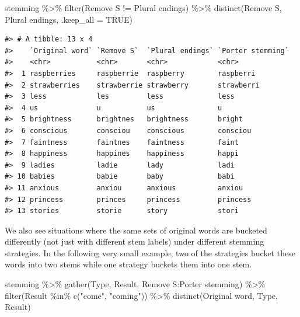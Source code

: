 \documentclass[
]{krantz}
\makeatletter
\newenvironment{Shaded}{\begin{snugshade}}{\end{snugshade}}
\newcommand{\AttributeTok}[1]{\textcolor[rgb]{0.77,0.63,0.00}{#1}}
\newcommand{\ConstantTok}[1]{\textcolor[rgb]{0.00,0.00,0.00}{#1}}
\newcommand{\FunctionTok}[1]{\textcolor[rgb]{0.00,0.00,0.00}{#1}}
\newcommand{\NormalTok}[1]{#1}
\newcommand{\SpecialCharTok}[1]{\textcolor[rgb]{0.00,0.00,0.00}{#1}}
\newcommand{\StringTok}[1]{\textcolor[rgb]{0.31,0.60,0.02}{#1}}
\newenvironment{kframe}{%
\medskip{}
\setlength{\fboxsep}{.8em}
 \def\at@end@of@kframe{}%
 \ifinner\ifhmode%
  \def\at@end@of@kframe{\end{minipage}}%
  \begin{minipage}{\columnwidth}%
 \fi\fi%
 \def\FrameCommand##1{\hskip\@totalleftmargin \hskip-\fboxsep
 \colorbox{shadecolor}{##1}\hskip-\fboxsep
     \hskip-\linewidth \hskip-\@totalleftmargin \hskip\columnwidth}%
 \MakeFramed {\advance\hsize-\width
   \@totalleftmargin\z@ \linewidth\hsize
   \@setminipage}}%
 {\par\unskip\endMakeFramed%
 \at@end@of@kframe}
\renewenvironment{Shaded}{\begin{kframe}}{\end{kframe}}
\makeatother
\begin{document}
\begin{Shaded}
\begin{Highlighting}[]
\NormalTok{stemming }\SpecialCharTok{\%\textgreater{}\%}
  \FunctionTok{filter}\NormalTok{(}\StringTok{\textasciigrave{}}\AttributeTok{Remove S}\StringTok{\textasciigrave{}} \SpecialCharTok{!=} \StringTok{\textasciigrave{}}\AttributeTok{Plural endings}\StringTok{\textasciigrave{}}\NormalTok{) }\SpecialCharTok{\%\textgreater{}\%}
  \FunctionTok{distinct}\NormalTok{(}\StringTok{\textasciigrave{}}\AttributeTok{Remove S}\StringTok{\textasciigrave{}}\NormalTok{, }\StringTok{\textasciigrave{}}\AttributeTok{Plural endings}\StringTok{\textasciigrave{}}\NormalTok{, }\AttributeTok{.keep\_all =} \ConstantTok{TRUE}\NormalTok{)}
\end{Highlighting}
\end{Shaded}

\begin{verbatim}
#> # A tibble: 13 x 4
#>    `Original word` `Remove S`  `Plural endings` `Porter stemming`
#>    <chr>           <chr>       <chr>            <chr>            
#>  1 raspberries     raspberrie  raspberry        raspberri        
#>  2 strawberries    strawberrie strawberry       strawberri       
#>  3 less            les         less             less             
#>  4 us              u           us               u                
#>  5 brightness      brightnes   brightness       bright           
#>  6 conscious       consciou    conscious        consciou         
#>  7 faintness       faintnes    faintness        faint            
#>  8 happiness       happines    happiness        happi            
#>  9 ladies          ladie       lady             ladi             
#> 10 babies          babie       baby             babi             
#> 11 anxious         anxiou      anxious          anxiou           
#> 12 princess        princes     princess         princess         
#> 13 stories         storie      story            stori
\end{verbatim}

We also see situations where the same sets of original words are bucketed differently (not just with different stem labels) under different stemming strategies. In the following very small example, two of the strategies bucket these words into two stems while one strategy buckets them into one stem.

\begin{Shaded}
\begin{Highlighting}[]
\NormalTok{stemming }\SpecialCharTok{\%\textgreater{}\%}
  \FunctionTok{gather}\NormalTok{(Type, Result, }\StringTok{\textasciigrave{}}\AttributeTok{Remove S}\StringTok{\textasciigrave{}}\SpecialCharTok{:}\StringTok{\textasciigrave{}}\AttributeTok{Porter stemming}\StringTok{\textasciigrave{}}\NormalTok{) }\SpecialCharTok{\%\textgreater{}\%}
  \FunctionTok{filter}\NormalTok{(Result }\SpecialCharTok{\%in\%} \FunctionTok{c}\NormalTok{(}\StringTok{"come"}\NormalTok{, }\StringTok{"coming"}\NormalTok{)) }\SpecialCharTok{\%\textgreater{}\%}
  \FunctionTok{distinct}\NormalTok{(}\StringTok{\textasciigrave{}}\AttributeTok{Original word}\StringTok{\textasciigrave{}}\NormalTok{, Type, Result)}
\end{Highlighting}
\end{Shaded}
\end{document}
